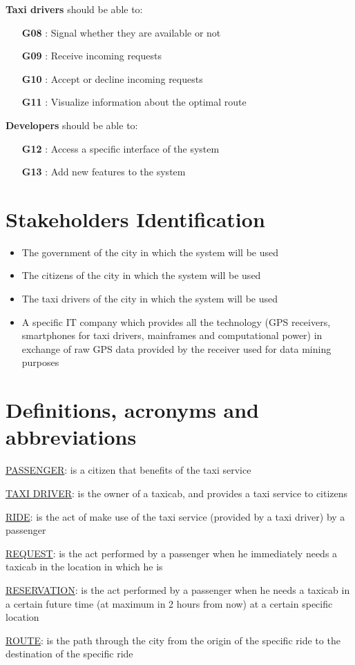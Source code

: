 \noindent \textbf{Taxi drivers} should be able to:
\begin{itemize}
	\item [\textbf{G08}] : Signal whether they are available or not
	\item [\textbf{G09}] : Receive incoming requests
	\item [\textbf{G10}] : Accept or decline incoming requests
	\item [\textbf{G11}] : Visualize information about the optimal route
\end{itemize}

\noindent \textbf{Developers} should be able to:
\begin{itemize}
	\item [\textbf{G12}] : Access a specific interface of the system 
	\item [\textbf{G13}] : Add new features to the system
\end{itemize}

\section{Stakeholders Identification}
\begin{itemize}
	\item The government of the city in which the system will be used
	\item The citizens of the city in which the system will be used
	\item The taxi drivers of the city in which the system will be used
	\item A specific IT company which provides all the technology (GPS receivers, smartphones for taxi drivers, mainframes and computational power) in exchange of raw GPS data provided by the receiver used for data mining purposes
\end{itemize}

\section{Definitions, acronyms and abbreviations}
\begin{description}
	\item \underline{PASSENGER}: is a citizen that benefits of the taxi service
	\item \underline{TAXI DRIVER}: is the owner of a taxicab, and provides a taxi service to citizens
	\item \underline{RIDE}: is the act of make use of the taxi service (provided by a taxi driver) by a passenger
	\item \underline{REQUEST}: is the act performed by a passenger when he immediately needs a taxicab in the location in which he is 
	\item \underline{RESERVATION}: is the act performed by a passenger when he needs a taxicab in a certain future time (at maximum in 2 hours from now) at a certain specific location
	\item \underline{ROUTE}: is the path through the city from the origin of the specific ride to the destination of the specific ride
\end{description}

